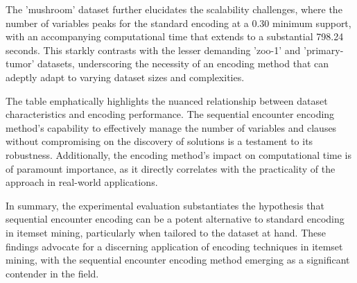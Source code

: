 The 'mushroom' dataset further elucidates the scalability challenges,
where the number of variables peaks for the standard encoding at a 0.30 minimum support,
with an accompanying computational time that extends to a substantial 798.24 seconds.
This starkly contrasts with the lesser demanding 'zoo-1' and 'primary-tumor' datasets,
underscoring the necessity of an encoding method that can adeptly adapt to varying dataset sizes and complexities.

The table emphatically highlights the nuanced relationship between dataset characteristics and
encoding performance. The sequential encounter encoding method's capability to
effectively manage the number of variables and clauses without compromising
on the discovery of solutions is a testament to its robustness.
Additionally, the encoding method's impact on computational time is of paramount importance,
as it directly correlates with the practicality of the approach in real-world applications.

In summary, the experimental evaluation substantiates the hypothesis that sequential encounter encoding can be a potent alternative to standard encoding in itemset mining,
particularly when tailored to the dataset at hand. These findings advocate for a discerning application of encoding techniques in itemset mining, with the sequential encounter
encoding method emerging as a significant contender in the field.